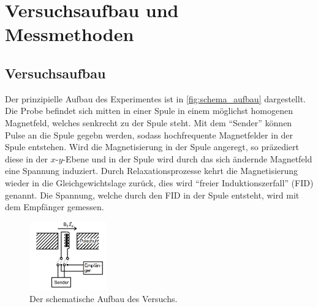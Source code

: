 \section{Versuchsaufbau und Messmethoden} 

    \subsection{Versuchsaufbau}
    \label{sec:Aufbau}

        \noindent Der prinzipielle Aufbau des Experimentes ist in \autoref{fig:schema_aufbau} dargestellt. Die Probe befindet sich mitten in einer Spule in einem möglichst homogenen Magnetfeld, welches senkrecht zu der Spule steht.
        Mit dem \enquote{Sender} können Pulse an die Spule gegebn werden, sodass hochfrequente Magnetfelder in der Spule entstehen. Wird die Magnetisierung in der Spule angeregt, so präzediert diese in der 
        $x$-$y$-Ebene und in der Spule wird durch das sich ändernde Magnetfeld eine Spannung induziert. Durch Relaxationsprozesse kehrt die Magnetisierung wieder in die Gleichgewichtslage zurück, dies wird 
        \enquote{freier Induktionszerfall} (FID) genannt. Die Spannung, welche durch den FID in der Spule entsteht, wird mit dem Empfänger gemessen. 

        \begin{figure}[H]
            \centering
            \includegraphics[width=0.3\textwidth]{images/schema_aufbau.png}
            \caption{Der schematische Aufbau des Versuchs. \cite{finke}}
            \label{fig:schema_aufbau}
        \end{figure}

